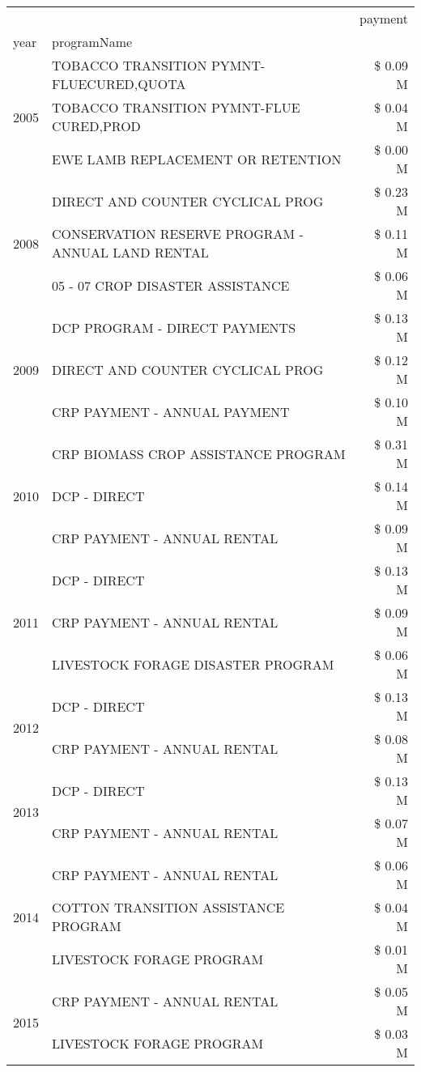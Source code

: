\begin{tabular}{llr}
\toprule
 &  & payment \\
year & programName &  \\
\midrule
\multirow[t]{3}{*}{2005} & TOBACCO TRANSITION PYMNT-FLUECURED,QUOTA & \$ 0.09 M \\
 & TOBACCO TRANSITION PYMNT-FLUE CURED,PROD & \$ 0.04 M \\
 & EWE LAMB REPLACEMENT OR RETENTION & \$ 0.00 M \\
\cline{1-3}
\multirow[t]{3}{*}{2008} & DIRECT AND COUNTER CYCLICAL PROG & \$ 0.23 M \\
 & CONSERVATION RESERVE PROGRAM - ANNUAL LAND RENTAL & \$ 0.11 M \\
 & 05 - 07 CROP DISASTER ASSISTANCE & \$ 0.06 M \\
\cline{1-3}
\multirow[t]{3}{*}{2009} & DCP PROGRAM - DIRECT PAYMENTS & \$ 0.13 M \\
 & DIRECT AND COUNTER CYCLICAL PROG & \$ 0.12 M \\
 & CRP PAYMENT - ANNUAL PAYMENT & \$ 0.10 M \\
\cline{1-3}
\multirow[t]{3}{*}{2010} & CRP BIOMASS CROP ASSISTANCE PROGRAM & \$ 0.31 M \\
 & DCP - DIRECT & \$ 0.14 M \\
 & CRP PAYMENT - ANNUAL RENTAL & \$ 0.09 M \\
\cline{1-3}
\multirow[t]{3}{*}{2011} & DCP - DIRECT & \$ 0.13 M \\
 & CRP PAYMENT - ANNUAL RENTAL & \$ 0.09 M \\
 & LIVESTOCK FORAGE DISASTER PROGRAM & \$ 0.06 M \\
\cline{1-3}
\multirow[t]{2}{*}{2012} & DCP - DIRECT & \$ 0.13 M \\
 & CRP PAYMENT - ANNUAL RENTAL & \$ 0.08 M \\
\cline{1-3}
\multirow[t]{2}{*}{2013} & DCP - DIRECT & \$ 0.13 M \\
 & CRP PAYMENT - ANNUAL RENTAL & \$ 0.07 M \\
\cline{1-3}
\multirow[t]{3}{*}{2014} & CRP PAYMENT - ANNUAL RENTAL & \$ 0.06 M \\
 & COTTON TRANSITION ASSISTANCE PROGRAM & \$ 0.04 M \\
 & LIVESTOCK FORAGE PROGRAM & \$ 0.01 M \\
\cline{1-3}
\multirow[t]{3}{*}{2015} & CRP PAYMENT - ANNUAL RENTAL & \$ 0.05 M \\
 & LIVESTOCK FORAGE PROGRAM & \$ 0.03 M \\

\end{tabular}
